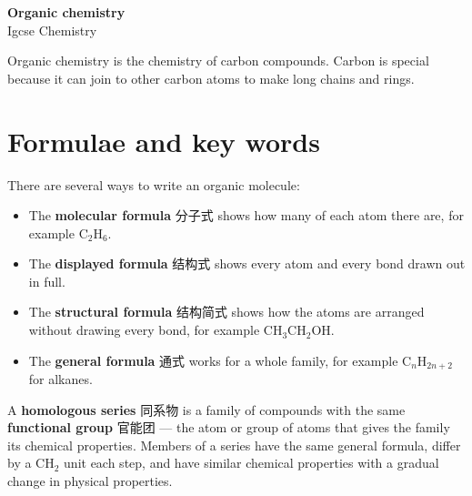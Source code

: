 \documentclass[11pt]{article}
\begin{document}
\begin{center}
  {\LARGE\bfseries Organic chemistry}\\[0.35em]
  {\large Igcse Chemistry}
\end{center}
\vspace{0.6em}

Organic chemistry is the chemistry of carbon compounds. Carbon is special because it can join to other carbon atoms to make long chains and rings.

\section*{Formulae and key words}

There are several ways to write an organic molecule:

\begin{itemize}
\item The \textbf{molecular formula} 分子式 shows how many of each atom there are, for example $\text{C}_2\text{H}_6$.

\item The \textbf{displayed formula} 结构式 shows every atom and every bond drawn out in full.

\item The \textbf{structural formula} 结构简式 shows how the atoms are arranged without drawing every bond, for example $\text{CH}_3\text{CH}_2\text{OH}$.

\item The \textbf{general formula} 通式 works for a whole family, for example $\text{C}_n\text{H}_{2n+2}$ for alkanes.

\end{itemize}

A \textbf{homologous series} 同系物 is a family of compounds with the same \textbf{functional group} 官能团 — the atom or group of atoms that gives the family its chemical properties. Members of a series have the same general formula, differ by a $\text{CH}_2$ unit each step, and have similar chemical properties with a gradual change in physical properties.

\begin{center}
\end{center}
\end{document}
